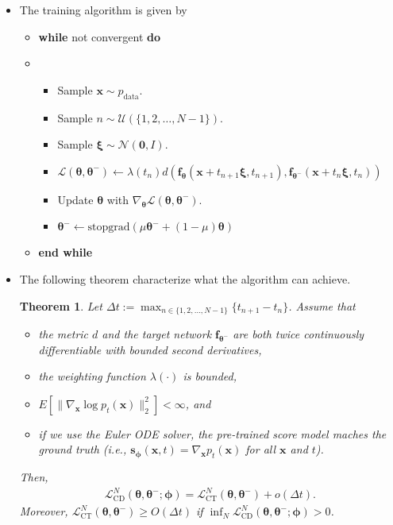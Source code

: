 \documentclass[10pt]{article}
\newtheorem{theorem}[lemma]{Theorem}
\newcommand{\ve}[1]{\mathbf{#1}}
\newcommand{\ves}[1]{\boldsymbol{#1}}
\newcommand{\mrm}[1]{\mathrm{#1}}
\newcommand{\mcal}[1]{\mathcal{#1}}
\newcommand{\data}{\mathrm{data}}
\begin{document}
\begin{itemize}
  \item The training algorithm is given by
  \begin{itemize}
    \item[] {\bf while} not convergent {\bf do}
    \item[] \begin{itemize}
      \item[] Sample $\ve{x} \sim p_{\data}$.
      \item[] Sample $n \sim \mcal{U}(\{ 1, 2, \dotsc, N-1\})$.
      \item[] Sample $\ves{\xi} \sim \mcal{N}(\ve{0}, I)$.
      \item[] $\mcal{L}(\ves{\theta},\ves{\theta}^-) \leftarrow \lambda(t_n) d(\ve{f}_{\ves{\theta}}(\ve{x} + t_{n+1}\ves{\xi}, t_{n+1}), \ves{f}_{\ves{\theta}^-}(\ve{x} + t_{n} \ves{\xi}, t_{n}))$
      \item[] Update $\ves{\theta}$ with $\nabla_{\ves{\theta}} \mcal{L}(\ves{\theta},\ves{\theta}^-)$.
      \item[] $\ves{\theta}^{-} \leftarrow \mrm{stopgrad}(\mu \ves{\theta}^- + (1-\mu)\ves{\theta})$
    \end{itemize}
    \item[] {\bf end while}
  \end{itemize}

  \item The following theorem characterize what the algorithm can achieve.
  \begin{theorem}
    Let $\Delta t := \max_{n \in \{1, 2, \dotsc, N-1\}}\{ t_{n+1} - t_{n} \}$. Assume that
    \begin{itemize}
      \item the metric $d$ and the target network $\ve{f}_{\ves{\theta}^-}$ are both twice continuously differentiable with bounded second derivatives,
      \item the weighting function $\lambda(\cdot)$ is bounded, 
      \item $E[\| \nabla_{\ve{x}} \log p_t(\ve{x}) \|_2^2] < \infty$, and
      \item if we use the Euler ODE solver, the pre-trained score model maches the ground truth (i.e., $\ve{s}_{\ves{\phi}}(\ve{x},t) = \nabla_{\ve{x}} p_t(\ve{x})$ for all $\ve{x}$ and $t$).
    \end{itemize}
    Then,
    \begin{align*}
      \mcal{L}^N_{\mrm{CD}}(\ves{\theta}, \ves{\theta}^-; \ves{\phi}) = \mcal{L}^N_{\mrm{CT}}(\ves{\theta},\ves{\theta}^-) + o(\Delta t).
    \end{align*}
    Moreover, $\mcal{L}_{\mrm{CT}}^N(\ves{\theta},\ves{\theta}^-) \geq O(\Delta t)$ if $\inf_{N} \mcal{L}_{\mrm{CD}}^N(\ves{\theta}, \ves{\theta}^-;\ves{\phi})> 0$.
  \end{theorem}


\end{itemize}
\end{document}
